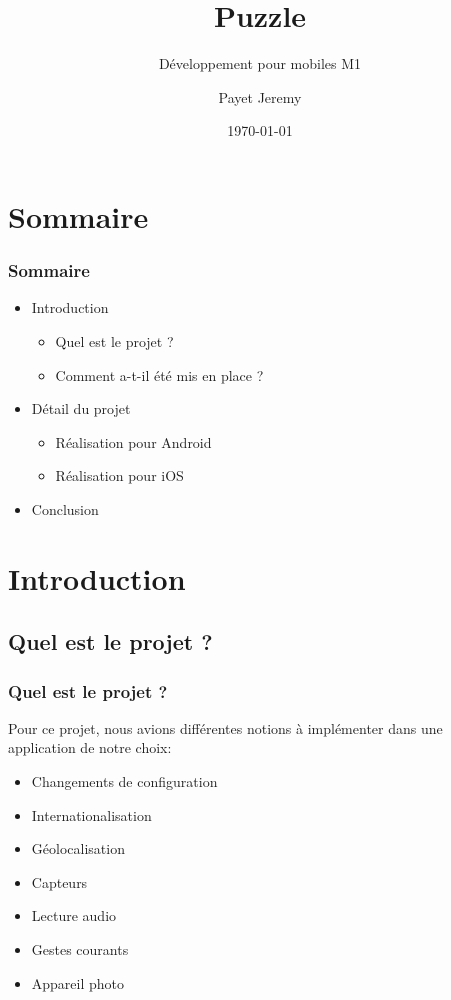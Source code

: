 \documentclass{beamer}
\title{Puzzle}
\subtitle{Développement pour mobiles M1}
\author[Payet Jeremy]{
      Payet Jeremy  
}
\date{\today}
\begin{document}
\begin{frame}[plain,t]
\titlepage
\end{frame}

\section{Sommaire}
\begin{frame}
\frametitle{Sommaire}
\begin{itemize}
\item Introduction
	\begin{itemize}
	\item Quel est le projet ?
	\item Comment a-t-il été mis en place ?
	\end{itemize}
\item Détail du projet
\begin{itemize}
	\item Réalisation pour Android
	\item Réalisation pour iOS
	\end{itemize}
\item Conclusion
\end{itemize}
\end{frame}

\section{Introduction}
\subsection{Quel est le projet ?}
\begin{frame}
\frametitle{Quel est le projet ?}

Pour ce projet, nous avions différentes notions à implémenter dans une application de notre choix: 
\begin{itemize}
\item Changements de configuration
\item Internationalisation
\item Géolocalisation
\item Capteurs
\item Lecture audio
\item Gestes courants
\item Appareil photo
\end{itemize}

\end{frame}
\end{document}
